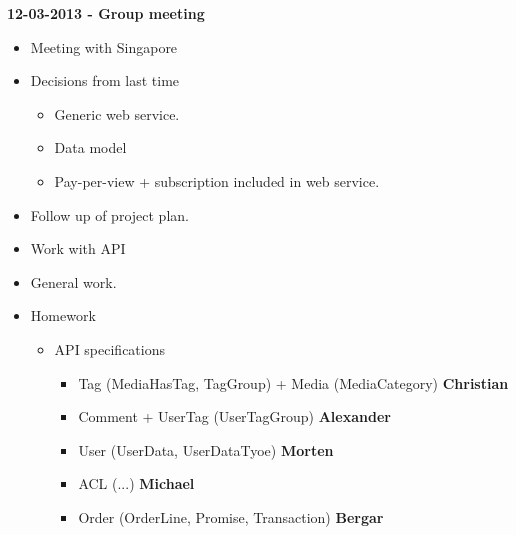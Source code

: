 \documentclass[11pt]{article}
\begin{document}
\begin{landscape}
\begin{multicols}{2}
\textbf{12-03-2013 - Group meeting}
\begin{itemize}
\item Meeting with Singapore
\item Decisions from last time
\begin{itemize}
\item Generic web service.
\item Data model
\item Pay-per-view + subscription included in web service.
\end{itemize}
\item Follow up of project plan.
\item Work with API
\item General work.
\item Homework
\begin{itemize}
\item API specifications
\begin{itemize}
\item Tag (MediaHasTag, TagGroup) + Media (MediaCategory) \textbf{Christian}
\item Comment + UserTag (UserTagGroup) \textbf{Alexander}
\item User (UserData, UserDataTyoe) \textbf{Morten}
\item ACL (...) \textbf{Michael}
\item Order (OrderLine, Promise, Transaction) \textbf{Bergar}
\end{itemize}
\end{itemize}
\end{itemize}


\end{multicols}
\end{landscape}
\end{document}

